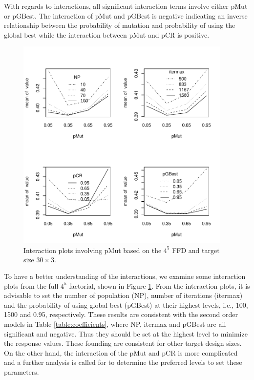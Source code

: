 \documentclass [PhD] {package/uclathes}
\begin{document}
With regards to interactions, all significant interaction terms involve either pMut or pGBest. The interaction of pMut and pGBest is negative indicating an inverse relationship between the probability of mutation and probability of using the global best while the interaction between pMut and pCR is positive.


\begin{figure}
\centering
\includegraphics[width=0.95\textwidth]{chapters/DE/pdfs/interactions}
\caption{Interaction plots involving pMut based on the $4^5$ FFD and target size $30\times3$.}
\label{interaction}
\end{figure}


To have a better understanding of the interactions, we examine some interaction plots from the full $4^5$  factorial, shown in Figure \ref{interaction}. %
From the interaction plots, it is advisable to set the number of population (NP), number of iterations (itermax) and the probability of using global best (pGBest) at their highest levels, i.e., 100, 1500 and 0.95, respectively.  These results are consistent with the second order models in Table \ref{table:coefficients}, where NP, itermax and pGBest are all significant and negative. Thus they should be set at the highest level to minimize the response values. These founding are consistent for other target design sizes.  On the other hand, the interaction of the pMut and pCR is more complicated and a further analysis is called for to determine the preferred levels to set these parameters.
\end{document}
